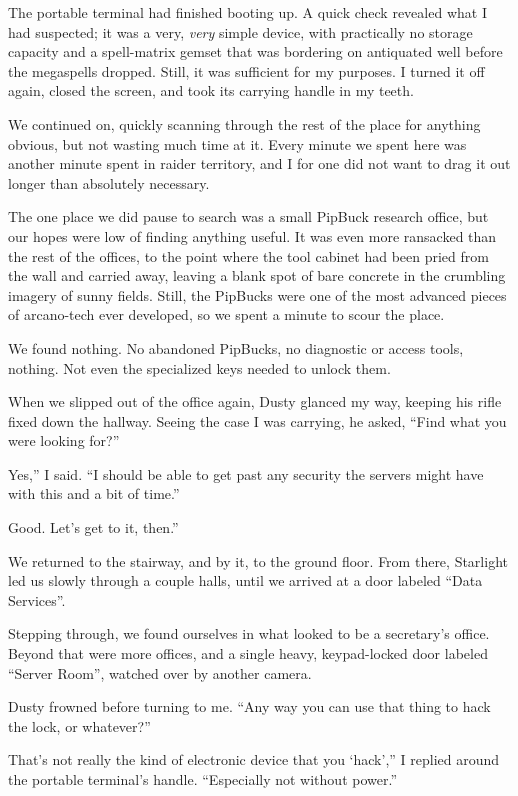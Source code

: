 The portable terminal had finished booting up. A quick check revealed what I had suspected; it was a very, \textit{very} simple device, with practically no storage capacity and a spell-matrix gemset that was bordering on antiquated well before the megaspells dropped. Still, it was sufficient for my purposes. I turned it off again, closed the screen, and took its carrying handle in my teeth.

We continued on, quickly scanning through the rest of the place for anything obvious, but not wasting much time at it. Every minute we spent here was another minute spent in raider territory, and I for one did not want to drag it out longer than absolutely necessary.

The one place we did pause to search was a small PipBuck research office, but our hopes were low of finding anything useful. It was even more ransacked than the rest of the offices, to the point where the tool cabinet had been pried from the wall and carried away, leaving a blank spot of bare concrete in the crumbling imagery of sunny fields. Still, the PipBucks were one of the most advanced pieces of arcano-tech ever developed, so we spent a minute to scour the place.

We found nothing. No abandoned PipBucks, no diagnostic or access tools, nothing. Not even the specialized keys needed to unlock them.

When we slipped out of the office again, Dusty glanced my way, keeping his rifle fixed down the hallway. Seeing the case I was carrying, he asked, “Find what you were looking for?”

\leavevmode{}Yes,” I said. “I should be able to get past any security the servers might have with this and a bit of time.”

\leavevmode{}Good. Let’s get to it, then.”

We returned to the stairway, and by it, to the ground floor. From there, Starlight led us slowly through a couple halls, until we arrived at a door labeled “Data Services”.

Stepping through, we found ourselves in what looked to be a secretary’s office. Beyond that were more offices, and a single heavy, keypad-locked door labeled “Server Room”, watched over by another camera.

Dusty frowned before turning to me. “Any way you can use that thing to hack the lock, or whatever?”

\leavevmode{}That’s not really the kind of electronic device that you ‘hack’,” I replied around the portable terminal’s handle. “Especially not without power.”

